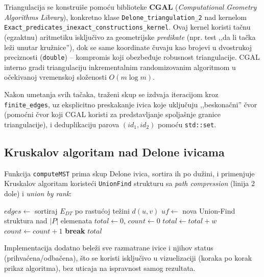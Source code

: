 \documentclass[11pt]{article}
\theoremstyle{definition}
\begin{document}
Triangulacija se konstruiše pomoću biblioteke \textbf{CGAL} (\emph{Computational Geometry Algorithms Library}), konkretno klase \texttt{Delone\allowbreak\_triangulation\allowbreak\_2} nad kernelom \texttt{Exact\allowbreak\_predicates\allowbreak\_inexact\allowbreak\_constructions\allowbreak\_kernel}. Ovaj kernel koristi tačnu (egzaktnu) aritmetiku isključivo za geometrijske \emph{predikate} (npr. test ,,da li tačka leži unutar kružnice''), dok se same koordinate čuvaju kao brojevi u dvostrukoj preciznosti (\texttt{double}) -- kompromis koji obezbeđuje robusnost triangulacije. CGAL interno gradi triangulaciju inkrementalnim randomizovanim algoritmom u očekivanoj vremenskoj složenosti $O(m \log m)$.

Nakon umetanja svih tačaka, traženi skup se izdvaja iteracijom kroz \texttt{finite\_edges}, uz eksplicitno preskakanje ivica koje uključuju ,,beskonačni'' čvor (pomoćni čvor koji CGAL koristi za predstavljanje spoljašnje granice triangulacije), i deduplikaciju parova $(id_1, id_2)$ pomoću \texttt{std::set}.

\subsection{Kruskalov algoritam nad Delone ivicama}

Funkcija \texttt{computeMST} prima skup Delone ivica, sortira ih po dužini, i primenjuje Kruskalov algoritam koristeći \texttt{UnionFind} strukturu sa \emph{path compression} (linija 2 dole) i \emph{union by rank}:

\begin{algorithm}[h]
\caption{Kruskalov algoritam nad Delone ivicama}
\begin{algorithmic}[1]
    \State $edges \gets$ sortiraj $E_{DT}$ po rastućoj težini $d(u,v)$
    \State $uf \gets$ nova Union-Find struktura nad $|P|$ elemenata
    \State $total \gets 0$, $count \gets 0$
         
            \State $total \gets total + w$
            \State $count \gets count + 1$
             \textbf{break} \EndIf
        \EndIf
    \EndFor
    \State \Return $total$
\EndFunction
\end{algorithmic}
\end{algorithm}

Implementacija dodatno beleži sve razmatrane ivice i njihov status (prihvaćena/odbačena), što se koristi isključivo u vizuelizaciji (koraka po korak prikaz algoritma), bez uticaja na ispravnost samog rezultata.
\end{document}
